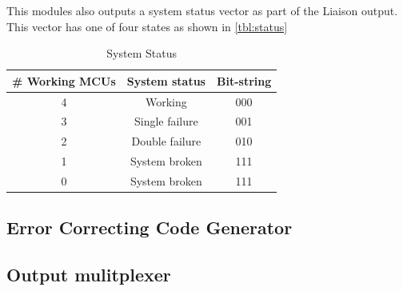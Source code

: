 This modules also outputs a system status vector as part of the Liaison output. This vector has one of four states as shown in \autoref{tbl:status}

\begin{table}[h]
        \centering
        \begin{tabular}{c|c|c}
        # Working MCUs     & System status & Bit-string \\
        \hline
        4 & Working        & 000 \\
        3 & Single failure & 001 \\
        2 & Double failure & 010 \\
        1 & System broken  & 111 \\
        0 & System broken  & 111
        \end{tabular}
        \caption{System Status}
        \label{tbl:status}
\end{table}

\subsection{Error Correcting Code Generator}
\subsection{Output mulitplexer}
